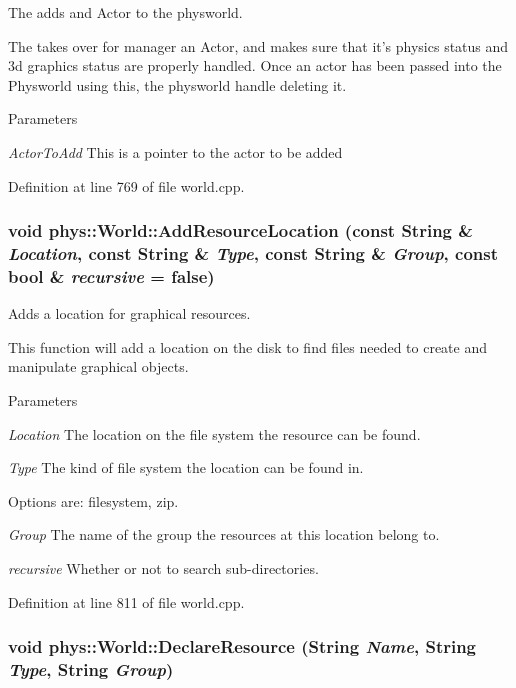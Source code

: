 The adds and Actor to the physworld. 

The takes over for manager an Actor, and makes sure that it's physics status and 3d graphics status are properly handled. Once an actor has been passed into the Physworld using this, the physworld handle deleting it. 
\begin{DoxyParams}{Parameters}
\item[{\em ActorToAdd}]This is a pointer to the actor to be added \end{DoxyParams}


Definition at line 769 of file world.cpp.

\hypertarget{classphys_1_1World_ab26033088abe4d60a40cf770dd1b0de8}{
\subsubsection[{AddResourceLocation}]{\setlength{\rightskip}{0pt plus 5cm}void phys::World::AddResourceLocation (const {\bf String} \& {\em Location}, \/  const {\bf String} \& {\em Type}, \/  const {\bf String} \& {\em Group}, \/  const bool \& {\em recursive} = {\ttfamily false})}}
\label{da/ddf/classphys_1_1World_ab26033088abe4d60a40cf770dd1b0de8}


Adds a location for graphical resources. 

This function will add a location on the disk to find files needed to create and manipulate graphical objects. 
\begin{DoxyParams}{Parameters}
\item[{\em Location}]The location on the file system the resource can be found. \item[{\em Type}]The kind of file system the location can be found in. \par
 Options are: filesystem, zip. \item[{\em Group}]The name of the group the resources at this location belong to. \item[{\em recursive}]Whether or not to search sub-\/directories. \end{DoxyParams}


Definition at line 811 of file world.cpp.

\hypertarget{classphys_1_1World_ad8c9834c1b9a0de437a0b29f17c0c48e}{
\subsubsection[{DeclareResource}]{\setlength{\rightskip}{0pt plus 5cm}void phys::World::DeclareResource ({\bf String} {\em Name}, \/  {\bf String} {\em Type}, \/  {\bf String} {\em Group})}}
\label{da/ddf/classphys_1_1World_ad8c9834c1b9a0de437a0b29f17c0c48e}


